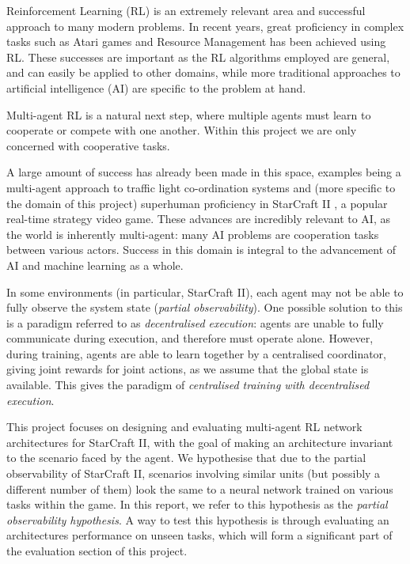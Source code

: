 Reinforcement Learning (RL) is an extremely relevant area and successful approach to many modern problems. In recent years, great proficiency in complex tasks such as Atari games \cite{dqn} and Resource Management \cite{resourcemanagement} has been achieved using RL. These successes are important as the RL algorithms employed are general, and can easily be applied to other domains, while more traditional approaches to artificial intelligence (AI) are specific to the problem at hand. 

Multi-agent RL is a natural next step, where multiple agents must learn to cooperate or compete with one another. Within this project we are only concerned with cooperative tasks. 

A large amount of success has already been made in this space, examples being a multi-agent approach to traffic light co-ordination systems \cite{traffic} and (more specific to the domain of this project) superhuman proficiency in StarCraft II \cite{alphastar}, a popular real-time strategy video game. These advances are incredibly relevant to AI, as the world is inherently multi-agent: many AI problems are cooperation tasks between various actors. Success in this domain is integral to the advancement of AI and machine learning as a whole.

In some environments (in particular, StarCraft II), each agent may not be able to fully observe the system state (\textit{partial observability}). One possible solution to this is a paradigm referred to as \textit{decentralised execution}: agents are unable to fully communicate during execution, and therefore must operate alone. However, during training, agents are able to learn together by a centralised coordinator, giving joint rewards for joint actions, as we assume that the global state is available. This gives the paradigm of \textit{centralised training with decentralised execution}.







This project focuses on designing and evaluating multi-agent RL network architectures for StarCraft II, with the goal of making an architecture invariant to the scenario faced by the agent. We hypothesise that due to the partial observability of StarCraft II, scenarios involving similar units (but possibly a different number of them) look the same to a neural network trained on various tasks within the game. In this report, we refer to this hypothesis as the \textit{partial observability hypothesis}. A way to test this hypothesis is through evaluating an architectures performance on unseen tasks, which will form a significant part of the evaluation section of this project.

